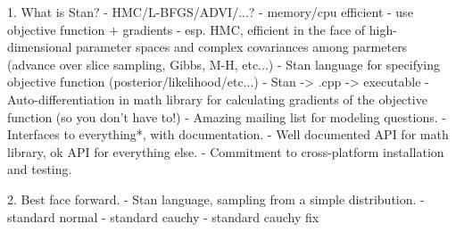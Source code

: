 


1. What is Stan?
 - HMC/L-BFGS/ADVI/...? 
   - memory/cpu efficient
	 - use objective function + gradients
	 - esp. HMC, efficient in the face of high-dimensional parameter spaces and 
	   complex covariances among parmeters (advance over slice sampling, 
		 Gibbs, M-H, etc...)
 - Stan language for specifying objective function (posterior/likelihood/etc...)
   - Stan -> .cpp -> executable
 - Auto-differentiation in math library for calculating gradients of the 
     objective function (so you don't have to!)
 - Amazing mailing list for modeling questions.
 - Interfaces to everything*, with documentation.
 - Well documented API for math library, ok API for everything else.
 - Commitment to cross-platform installation and testing.

2. Best face forward.
 - Stan language, sampling from a simple distribution.
   - standard normal
	 - standard cauchy
	 - standard cauchy fix













